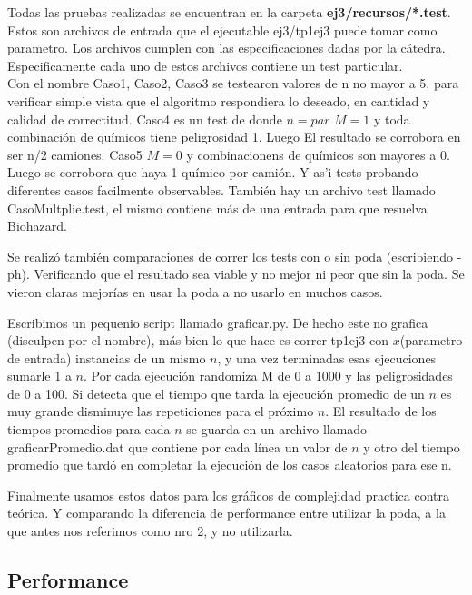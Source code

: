 \noindent 
Todas las pruebas realizadas se encuentran en la carpeta \textbf{ej3/recursos/*.test}.\\
Estos son archivos de entrada que el ejecutable ej3/tp1ej3 puede tomar como parametro. Los archivos cumplen con las especificaciones dadas por la c\'atedra. Especificamente cada uno de estos archivos contiene un test particular. \\
Con el nombre Caso1, Caso2, Caso3 se testearon valores de n no mayor a 5, para verificar simple vista que el algoritmo respondiera lo deseado, en cantidad y calidad de correctitud.
Caso4 es un test de donde $n=par$ $M=1$ y toda combinaci\'on de qu\'imicos tiene peligrosidad 1. Luego El resultado se corrobora en ser n/2 camiones.
Caso5 $M=0$ y combinacionens de qu\'imicos son mayores a 0. Luego se corrobora que haya 1 qu\'imico por cami\'on.
Y as'i tests probando diferentes casos facilmente observables.
Tambi\'en hay un archivo test llamado CasoMultplie.test, el mismo contiene m\'as de una entrada para que resuelva Biohazard. 

\noindent 
Se realiz\'o tambi\'en comparaciones de correr los tests con o sin poda (escribiendo -ph). Verificando que el resultado sea viable y no mejor ni peor que sin la poda. Se vieron claras mejor\'ias en usar la poda a no usarlo en muchos casos. 

\noindent 
Escribimos un pequenio script llamado graficar.py. De hecho este no grafica (disculpen por el nombre), m\'as bien lo que hace es correr tp1ej3 con $x$(parametro de entrada) instancias de un mismo $n$, y una vez terminadas esas ejecuciones sumarle 1 a $n$. Por cada ejecuci\'on randomiza M de 0 a 1000 y las peligrosidades de 0 a 100. Si detecta que el tiempo que tarda la ejecuci\'on promedio de un $n$ es muy grande disminuye las repeticiones para el pr\'oximo $n$.
El resultado de los tiempos promedios para cada $n$ se guarda en un archivo llamado graficarPromedio.dat que contiene por cada l\'inea un valor de $n$ y otro del tiempo promedio que tard\'o en completar la ejecuci\'on de los casos aleatorios para ese n.

\noindent 
Finalmente usamos estos datos para los gr\'aficos de complejidad practica contra te\'orica. Y comparando la diferencia de performance entre utilizar la poda, a la que antes nos referimos como nro 2, y no utilizarla.

\subsection{Performance}


